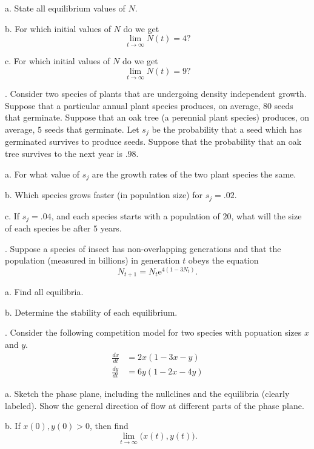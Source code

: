 \documentclass[reqno,12pt]{amsart}
\def\eee{\textrm{e}}
\def \dxdt{\frac{dx}{dt}}
\def \dydt{\frac{dy}{dt}}
\begin{document}
\noindent
a.  State all equilibrium values of $N$.

\noindent
b.  For which initial values of $N$ do we get
$$
\lim_{t \to \infty} N(t) = 4?
$$

\noindent
c.  For which initial values of $N$ do we get
$$
\lim_{t \to \infty} N(t) = 9?
$$

\newpage

.  Consider two species of plants that are undergoing density
independent growth.  Suppose that a particular annual plant
species produces, on average, $80$ seeds that germinate.  Suppose
that an oak tree (a perennial plant species) produces, on average,
$5$ seeds that germinate.  Let $s_j$ be the probability that a seed
which has germinated survives to produce seeds.  Suppose that the
probability that an oak tree survives to the next year is $.98$.

\noindent
a.  For what value of $s_j$ are the growth rates of the two plant
species the same.

\noindent
b.  Which species grows faster (in population size) for $s_j=.02$.

\noindent
c.  If $s_j=.04$, and each species starts with a population of
$20$, what will the size of each species be after $5$ years.

\newpage

.  Suppose a species of insect has non-overlapping generations
and that the population (measured in billions) in generation $t$
obeys the equation
$$
N_{t+1} = N_t \eee^{4(1- 3 N_t)}.
$$

\noindent
a.  Find all equilibria.

\noindent
b.  Determine the stability of each equilibrium.

\newpage

.  Consider the following competition model for two species with
popuation sizes $x$ and $y$.
\begin{align*}
\dxdt &= 2 x (1 - 3x - y) \\
\dydt &= 6 y (1 - 2x - 4y)
\end{align*}

\noindent
a.  Sketch the phase plane, including the nullclines and the
equilibria (clearly labeled).  Show the general direction of
flow at different parts of the phase plane.

\noindent
b.  If $x(0), y(0) > 0$, then find
$$
\lim_{t \to \infty} \bigl( x(t), y(t) \bigr).
$$
\end{document}
